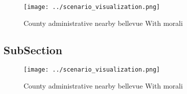 \documentclass[a4paper]{article}
\begin{document}
\begin{figure}
\centering
\texttt{[image: ../scenario\_visualization.png]}
\caption{County administrative nearby bellevue With morali
}
\end{figure}
 
\subsection{SubSection}

\begin{figure}
\centering
\texttt{[image: ../scenario\_visualization.png]}
\caption{County administrative nearby bellevue With morali
}
\end{figure}
 
\end{document}
